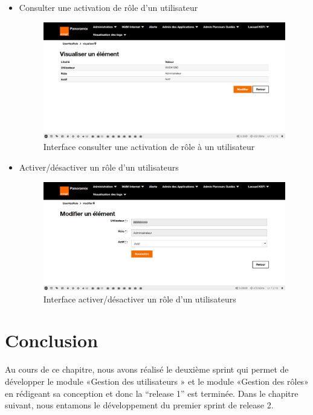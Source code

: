 \begin{itemize}
	\item Consulter une activation de rôle d'un utilisateur
	\begin{figure}[H]
		\centering
		\includegraphics[width=0.7\linewidth]{"img/screenshots/activation des roles/view"}
		\caption[Interface voir une activation de rôle à un utilisateur]{Interface consulter une activation de rôle à un utilisateur}
		\label{fig:view-activation}
	\end{figure}
	\newpage
	\item Activer/désactiver un rôle d'un utilisateurs
	\begin{figure}[H]
		\centering
		\includegraphics[width=0.7\linewidth]{"img/screenshots/activation des roles/edit"}
		\caption[Interface activer/désactiver un rôle d'un utilisateurs]{Interface activer/désactiver un rôle d'un utilisateurs}
		\label{fig:create-activation}
	\end{figure}
\end{itemize}

\section*{Conclusion}
Au cours de ce chapitre, nous avons réalisé le deuxième sprint qui permet de développer le module «Gestion des utilisateurs » et le module «Gestion des rôles» en rédigeant sa conception et donc la “release 1” est terminée. Dans le chapitre suivant, nous entamons le développement du premier sprint de release 2. 
